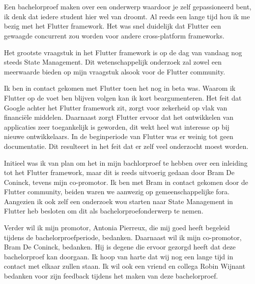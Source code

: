 
\chapter*{}
\label{ch:voorwoord}

Een bachelorproef maken over een onderwerp waardoor je zelf gepassioneerd bent, 
ik denk dat iedere student hier wel van droomt. Al reeds een lange tijd hou ik me bezig met 
het Flutter framework. Het was snel duidelijk dat Flutter een gewaagde concurrent zou worden voor andere cross-platform frameworks.

Het grootste vraagstuk in het Flutter framework is op de dag van vandaag nog steeds State Management.
Dit wetenschappelijk onderzoek zal zowel een meerwaarde bieden op mijn vraagstuk alsook voor de Flutter community.

Ik ben in contact gekomen met Flutter toen het nog in beta was. Waarom ik Flutter op de voet ben blijven volgen kan ik kort beargumenteren. Het feit dat Google achter het Flutter framework zit, zorgt voor zekerheid op vlak van financiële middelen. Daarnaast zorgt Flutter ervoor dat het ontwikkelen van applicaties zeer toegankelijk is geworden, dit wekt heel wat interesse op bij nieuwe ontwikkelaars. In de beginperiode van Flutter was er weinig tot geen documentatie. Dit resulteert in het feit dat er zelf veel onderzocht moest worden.

Initieel was ik van plan om het in mijn bachlorproef te hebben over een inleiding tot het Flutter framework, maar dit is reeds uitvoerig gedaan door Bram De Coninck, tevens mijn co-promotor. Ik ben met Bram in contact gekomen door de Flutter community, beiden waren we aanwezig op gemeenschappelijke fora. Aangezien ik ook zelf een onderzoek wou starten naar State Management in Flutter heb besloten om dit als bachelorproefonderwerp te nemen.


Verder wil ik mijn promotor, Antonia Pierreux, die mij goed heeft begeleid tijdens de bachelorproefperiode, bedanken.
Daarnaast wil ik mijn co-promotor, Bram De Coninck, bedanken. Hij is degene die ervoor gezorgd heeft dat deze bachelorproef kan doorgaan. Ik hoop van harte dat wij nog een lange tijd in contact met elkaar zullen staan. Ik wil ook een vriend en collega Robin Wijnant bedanken voor zijn feedback tijdens het maken van deze bachelorproef.


